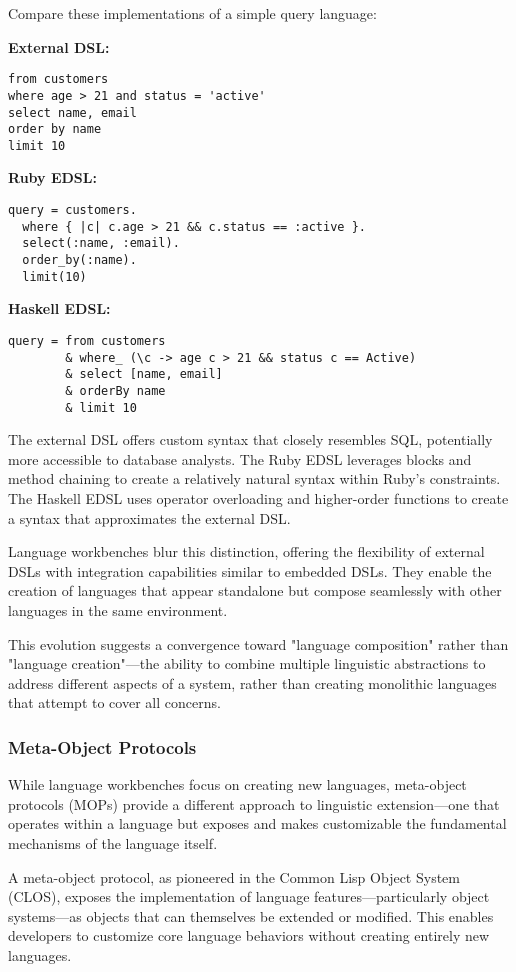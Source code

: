 \documentclass[11pt]{article}
\begin{document}
Compare these implementations of a simple query language:

\textbf{\textbf{External DSL:}}
\begin{verbatim}
from customers
where age > 21 and status = 'active'
select name, email
order by name
limit 10
\end{verbatim}

\textbf{\textbf{Ruby EDSL:}}
\begin{verbatim}
query = customers.
  where { |c| c.age > 21 && c.status == :active }.
  select(:name, :email).
  order_by(:name).
  limit(10)
\end{verbatim}

\textbf{\textbf{Haskell EDSL:}}
\begin{verbatim}
query = from customers
        & where_ (\c -> age c > 21 && status c == Active)
        & select [name, email]
        & orderBy name
        & limit 10
\end{verbatim}

The external DSL offers custom syntax that closely resembles SQL, potentially more accessible to database analysts. The Ruby EDSL leverages blocks and method chaining to create a relatively natural syntax within Ruby's constraints. The Haskell EDSL uses operator overloading and higher-order functions to create a syntax that approximates the external DSL.

Language workbenches blur this distinction, offering the flexibility of external DSLs with integration capabilities similar to embedded DSLs. They enable the creation of languages that appear standalone but compose seamlessly with other languages in the same environment.

This evolution suggests a convergence toward "language composition" rather than "language creation"—the ability to combine multiple linguistic abstractions to address different aspects of a system, rather than creating monolithic languages that attempt to cover all concerns.
\subsubsection{Meta-Object Protocols}
\label{sec:org925de49}

While language workbenches focus on creating new languages, meta-object protocols (MOPs) provide a different approach to linguistic extension—one that operates within a language but exposes and makes customizable the fundamental mechanisms of the language itself.

A meta-object protocol, as pioneered in the Common Lisp Object System (CLOS), exposes the implementation of language features—particularly object systems—as objects that can themselves be extended or modified. This enables developers to customize core language behaviors without creating entirely new languages.
\end{document}
